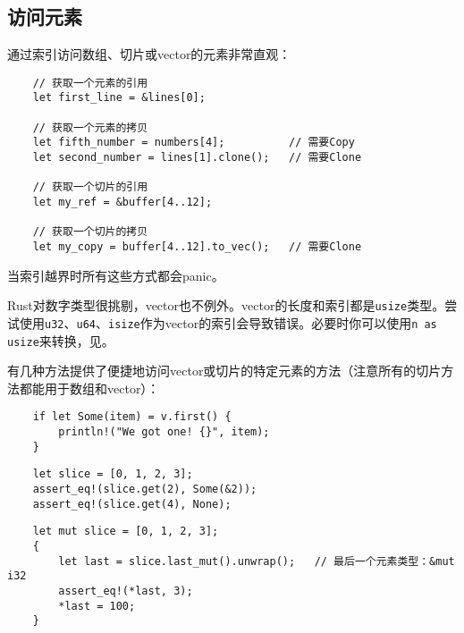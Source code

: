 \subsection{访问元素}
通过索引访问数组、切片或vector的元素非常直观：
\begin{verbatim}
    // 获取一个元素的引用
    let first_line = &lines[0];

    // 获取一个元素的拷贝 
    let fifth_number = numbers[4];          // 需要Copy
    let second_number = lines[1].clone();   // 需要Clone

    // 获取一个切片的引用
    let my_ref = &buffer[4..12];

    // 获取一个切片的拷贝
    let my_copy = buffer[4..12].to_vec();   // 需要Clone
\end{verbatim}

当索引越界时所有这些方式都会panic。

Rust对数字类型很挑剔，vector也不例外。vector的长度和索引都是\texttt{usize}类型。尝试使用\texttt{u32}、\texttt{u64}、\texttt{isize}作为vector的索引会导致错误。必要时你可以使用\texttt{n as usize}来转换，见。

有几种方法提供了便捷地访问vector或切片的特定元素的方法（注意所有的切片方法都能用于数组和vector）：

\begin{verbatim}
    if let Some(item) = v.first() {
        println!("We got one! {}", item);
    }
\end{verbatim}


\begin{verbatim}
    let slice = [0, 1, 2, 3];
    assert_eq!(slice.get(2), Some(&2));
    assert_eq!(slice.get(4), None);
\end{verbatim}

\begin{verbatim}
    let mut slice = [0, 1, 2, 3];
    {
        let last = slice.last_mut().unwrap();   // 最后一个元素类型：&mut i32
        assert_eq!(*last, 3);
        *last = 100;
    }
\end{verbatim}

